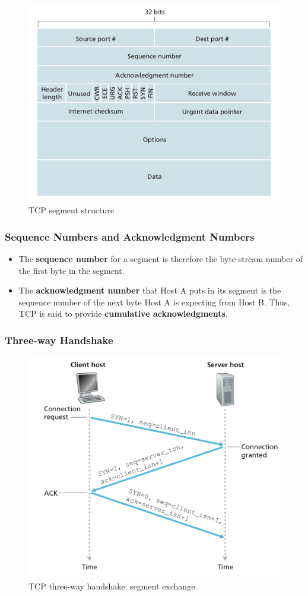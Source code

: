 \documentclass[11pt]{article}
\begin{document}
\begin{figure}[h]
	\centering
	\includegraphics[width=0.8\linewidth]{images/tcp.png}
	\caption{TCP segment structure}
	\label{fig:tcp}
\end{figure}

\subsubsection{Sequence Numbers and Acknowledgment Numbers}

\begin{itemize}

	\item 
	
	The \textbf{sequence number} for a segment is therefore the byte-stream number of the first byte in the segment. 
	
	\item 
	
	The \textbf{acknowledgment number} that Host A puts in its segment is the sequence number of the next byte Host A is expecting from Host B. Thus, TCP is said to provide \textbf{cumulative acknowledgments}.
\end{itemize}

\subsubsection{Three-way Handshake}

\begin{figure}[h]
	\centering
	\includegraphics[width=0.6\linewidth]{images/Three-wayHandshake.png}
	\caption{TCP three-way handshake: segment exchange}
	\label{fig:Three-wayHandshake}
\end{figure}
\end{document}
